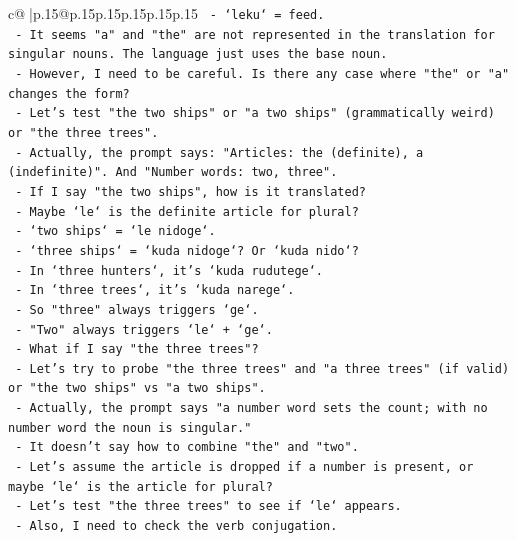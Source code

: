 \documentclass{article}
\begin{document}
{\begin{supertabular}{c@{$\;$}|p{.15\linewidth}@{}p{.15\linewidth}p{.15\linewidth}p{.15\linewidth}p{.15\linewidth}p{.15\linewidth}}
{{{\texttt{                 {-} `leku` = feed.} \\
\texttt{               {-} It seems "a" and "the" are not represented in the translation for singular nouns. The language just uses the base noun.} \\
\texttt{               {-} However, I need to be careful. Is there any case where "the" or "a" changes the form?} \\
\texttt{               {-} Let's test "the two ships" or "a two ships" (grammatically weird) or "the three trees".} \\
\texttt{               {-} Actually, the prompt says: "Articles: the (definite), a (indefinite)". And "Number words: two, three".} \\
\texttt{               {-} If I say "the two ships", how is it translated?} \\
\texttt{               {-} Maybe `le` is the definite article for plural?} \\
\texttt{                 {-} `two ships` = `le nidoge`.} \\
\texttt{                 {-} `three ships` = `kuda nidoge`? Or `kuda nido`?} \\
\texttt{                 {-} In `three hunters`, it's `kuda rudutege`.} \\
\texttt{                 {-} In `three trees`, it's `kuda narege`.} \\
\texttt{                 {-} So "three" always triggers `ge`.} \\
\texttt{                 {-} "Two" always triggers `le` + `ge`.} \\
\texttt{                 {-} What if I say "the three trees"?} \\
\texttt{                 {-} Let's try to probe "the three trees" and "a three trees" (if valid) or "the two ships" vs "a two ships".} \\
\texttt{                 {-} Actually, the prompt says "a number word sets the count; with no number word the noun is singular."} \\
\texttt{                 {-} It doesn't say how to combine "the" and "two".} \\
\texttt{                 {-} Let's assume the article is dropped if a number is present, or maybe `le` is the article for plural?} \\
\texttt{                 {-} Let's test "the three trees" to see if `le` appears.} \\
\texttt{                 {-} Also, I need to check the verb conjugation.} \\
}}}
\end{supertabular}}
\end{document}
